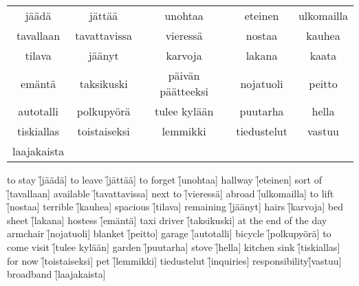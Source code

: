 \begin{center}
  \begin{tabular}{|c c c c c|}
    \hline
    jäädä & jättää & unohtaa & eteinen & ulkomailla \\
    tavallaan & tavattavissa & vieressä & nostaa & kauhea \\
    tilava & jäänyt & karvoja & lakana & kaata  \\
    emäntä & taksikuski & päivän päätteeksi & nojatuoli & peitto \\
    autotalli & polkupyörä & tulee kylään & puutarha & hella \\
    tiskiallas & toistaiseksi & lemmikki & tiedustelut & vastuu  \\
    laajakaista &&&& \\
    \hline
  \end{tabular}
\end{center}

\begin{questions}
  \begin{multicols}{3}
    \raggedcolumns
    \question to stay   \f[jäädä]
    \question to leave  \f[jättää]
    \question to forget \f[unohtaa]
    \question hallway   \f[eteinen]
    \question sort of   \f[tavallaan]
    \question available \f[tavattavissa]
    \question next to   \f[vieressä]
    \question abroad    \f[ulkomailla]
    \question to lift   \f[nostaa]
    \question terrible  \f[kauhea]
    \question spacious  \f[tilava]
    \question remaining \f[jäänyt]
    \question hairs     \f[karvoja]
    \question bed sheet \f[lakana]
    \question hostess   \f[emäntä]
    \question taxi driver \f[taksikuski]
    \question at the end of the day 
    \question armchair  \f[nojatuoli]
    \question blanket   \f[peitto]
    \question garage    \f[autotalli]
    \question bicycle   \f[polkupyörä]
    \question to come visit \f[tulee kylään]
    \question garden        \f[puutarha]
    \question stove         \f[hella]
    \question kitchen sink  \f[tiskiallas]
    \question for now       \f[toistaiseksi]
    \question pet           \f[lemmikki]
    \question tiedustelut   \f[inquiries]
    \question responsibility\f[vastuu]
    \question broadband     \f[laajakaista]
  \end{multicols}
\end{questions}
